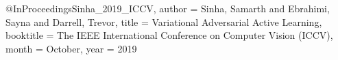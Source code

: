 @InProceedings{Sinha_2019_ICCV,
author = {Sinha, Samarth and Ebrahimi, Sayna and Darrell, Trevor},
title = {Variational Adversarial Active Learning},
booktitle = {The IEEE International Conference on Computer Vision (ICCV)},
month = {October},
year = {2019}
}